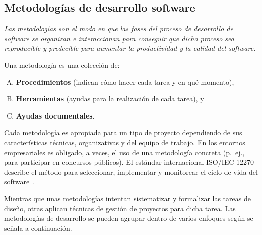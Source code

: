 \subsection{Metodologías de desarrollo software}
\emph{Las metodologías son el modo en que las fases del proceso de desarrollo de software se organizan e interaccionan para conseguir que dicho proceso sea reproducible y predecible para aumentar la productividad y la calidad del software.}

\noindent Una metodología es una colección de:

\begin{enumerate}[A.]
\item \textbf{Procedimientos} (indican cómo hacer cada tarea y en qué momento),
\item \textbf{Herramientas} (ayudas para la realización de cada tarea), y
\item \textbf{Ayudas documentales}.
\end{enumerate}

Cada metodología es apropiada para un tipo de proyecto dependiendo de sus características técnicas, organizativas y del equipo de trabajo. En los entornos empresariales es obligado, a veces, el uso de una metodología concreta (p.~ej., para participar en concursos públicos). El estándar internacional ISO/IEC 12270 describe el método para seleccionar, implementar y monitorear el ciclo de vida del software~\cite{Vijayasarathy16,Appelbaum22}.

Mientras que unas metodologías intentan sistematizar y formalizar las tareas de diseño, otras aplican técnicas de gestión de proyectos para dicha tarea. Las metodologías de desarrollo se pueden agrupar dentro de varios enfoques según se señala a continuación.

